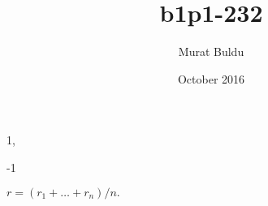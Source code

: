 \documentclass{amsbook}
\title{b1p1-232}
\author{Murat Buldu}
\date{October 2016}
\begin{document}
\begin{hEnumerateArabic}
    \setcounter{enumi}{207}
    \item  
        \begin{hEnumerateAlpha}
            \begin{multicols}{2}
                \item 1,
                \columnbreak
                \item -1
            \end{multicols}
        \end{hEnumerateAlpha}
    \setcounter{enumi}{209}
    \item $ r = (r_1 + \ldots + r_n ) / n. $
\end{hEnumerateArabic}
\end{document}
